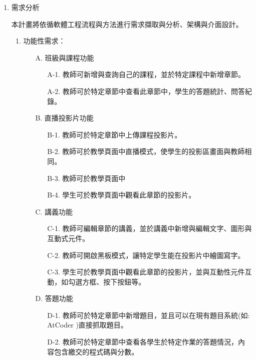 \documentclass[12pt]{article}
\begin{document}
\begin{enumerate}
  \item 需求分析
    \par 本計畫將依循軟體工程流程與方法進行需求擷取與分析、架構與介面設計。
    \begin{enumerate}
      \setlength{\parindent}{2em}
      \item 功能性需求：%
        \begin{enumerate}[itemindent=12pt]
          \item [A.] 班級與課程功能
            \begin{enumerate}[itemindent=24pt]
              \item [A-1.] 教師可新增與查詢自己的課程，並於特定課程中新增章節。
              \item [A-2.] 教師可於特定章節中查看此章節中，學生的答題統計、問答紀錄。
            \end{enumerate}
          \item [B.] 直播投影片功能
            \begin{enumerate}[itemindent=24pt]
              \item [B-1.] 教師可於特定章節中上傳課程投影片。
              \item [B-2.] 教師可於教學頁面中直播模式，使學生的投影區畫面與教師相同。
              \item [B-3.] 教師可於教學頁面中
              \item [B-4.] 學生可於教學頁面中觀看此章節的投影片。
            \end{enumerate}
          \item [C.] 講義功能
            \begin{enumerate}[itemindent=24pt]
              \item [C-1.] 教師可編輯章節的講義，並於講義中新增與編輯文字、圖形與互動式元件。
              \item [C-2.] 教師可開啟黑板模式，讓特定學生能在投影片中繪圖寫字。
              \item [C-3.] 學生可於教學頁面中觀看此章節的投影片，並與互動性元件互動，如勾選方框、按下按鈕等。
            \end{enumerate}
          \item [D.] 答題功能
            \begin{enumerate}[itemindent=24pt]
              \item [D-1.] 教師可於特定章節中新增題目，並且可以在現有題目系統(如: AtCoder%
              )直接抓取題目。
              \item [D-2.] 教師可於特定章節中查看各學生於特定作業的答題情況，內容包含繳交的程式碼與分數。

\end{enumerate}
\end{enumerate}
\end{enumerate}
\end{enumerate}
\end{document}
